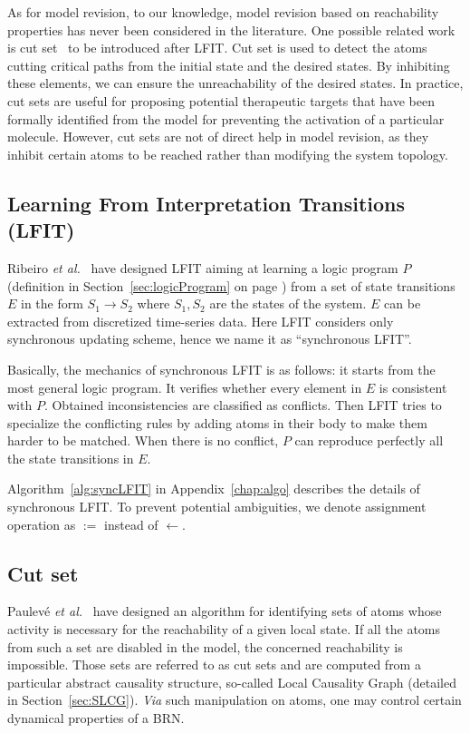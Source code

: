 As for model revision, to our knowledge, model revision based on reachability properties has never been considered in the literature.
One possible related work is cut set~\cite{PAK13-CAV} to be introduced after LFIT.
Cut set is used to detect the atoms cutting critical paths from the initial state and the desired states.
By inhibiting %
these elements, we can ensure the unreachability of the desired states.
In practice, cut sets are useful for proposing potential therapeutic targets that have been formally identified from the model for preventing the activation of a particular molecule.
However, cut sets are not of direct help in model revision, as they inhibit certain atoms to be reached rather than modifying the system topology.

\subsection{Learning From Interpretation Transitions (LFIT)}\label{sec:lfitSyn}
Ribeiro \textit{et al.}~\cite{ribeiro2015learning} have designed LFIT %
aiming at learning a logic program $P$ (definition in Section~\ref{sec:logicProgram} on page \pageref{sec:logicProgram}) from a set of state transitions $E$ in the form $S_1\to S_2$ where $S_1,S_2$ are the states of the system.
$E$ can be extracted from discretized time-series data.
Here LFIT considers only synchronous updating scheme, hence we name it as ``synchronous LFIT''.

Basically, the mechanics of synchronous LFIT is as follows: it starts from the most general logic program.
It verifies whether every element in $E$ is consistent with $P$.
Obtained inconsistencies are classified as conflicts.
Then LFIT tries to specialize the conflicting rules by adding atoms in their body to make them harder to be matched.
When there is no conflict, $P$ can reproduce perfectly all the state transitions in $E$.

Algorithm~\ref{alg:syncLFIT} in Appendix~\ref{chap:algo} describes the details of synchronous LFIT.
To prevent potential ambiguities, we denote assignment operation as $:=$ instead of $\gets$. 


\subsection{Cut set}\label{sec:cutset}

Paulev\'e \textit{et al.}~\cite{PAK13-CAV} have designed an algorithm for identifying sets of atoms whose activity is necessary for the reachability of a given local state. 
If all the atoms from such a set are disabled in the model, the concerned reachability is impossible. 
Those sets are referred to as cut sets and are computed from a particular abstract causality structure, so-called Local Causality Graph (detailed in Section~\ref{sec:SLCG}).
\textit{Via} such manipulation on atoms, one may control certain dynamical properties of a BRN.

